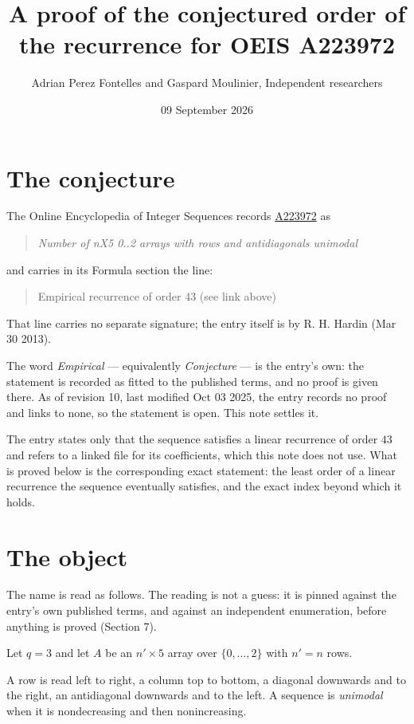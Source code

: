 \documentclass[11pt]{article}
\title{A proof of the conjectured order of the recurrence for OEIS A223972}
\author{Adrian Perez Fontelles and Gaspard Moulinier, Independent researchers}
\date{09 September 2026}
\theoremstyle{definition}
\begin{document}
\maketitle
\section{The conjecture}

The Online Encyclopedia of Integer Sequences records \href{https://oeis.org/A223972}{A223972} as

\begin{quote}\itshape Number of nX5 0..2 arrays with rows and antidiagonals unimodal\end{quote}

and carries in its Formula section the line:

\begin{quote}\ttfamily Empirical recurrence of order 43 (see link above)\end{quote}

That line carries no separate signature; the entry itself is by R. H. Hardin (Mar 30 2013).

The word {\itshape Empirical} --- equivalently {\itshape Conjecture} --- is the entry's own: the statement is recorded as fitted to the published terms, and no proof is given there. As of revision 10, last modified Oct 03 2025, the entry records no proof and links to none, so the statement is open. This note settles it.

The entry states only that the sequence satisfies a linear recurrence of order $43$ and refers to a linked file for its coefficients, which this note does not use. What is proved below is the corresponding exact statement: the least order of a linear recurrence the sequence eventually satisfies, and the exact index beyond which it holds.

\section{The object}

The name is read as follows. The reading is not a guess: it is pinned against the entry's own published terms, and against an independent enumeration, before anything is proved (Section 7).

Let $q = 3$ and let $A$ be an $n' \times 5$ array over $\{0,\dots,2\}$ with $n' = n$ rows.

A row is read left to right, a column top to bottom, a diagonal downwards and to the right, an antidiagonal downwards and to the left. A sequence is {\itshape unimodal} when it is nondecreasing and then nonincreasing.
\end{document}
